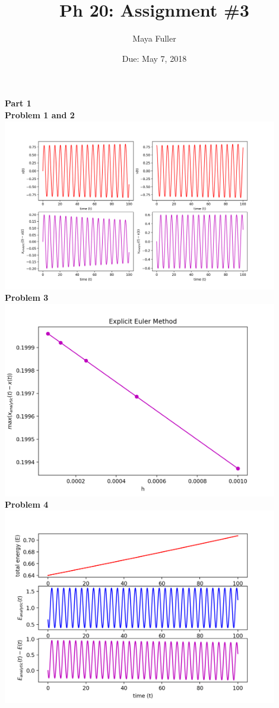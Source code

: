 \documentclass[12pt]{article}
\title{Ph 20: Assignment \#3}
\author{Maya Fuller}
\date{Due: May 7, 2018} %
\begin{document}
	
	
	\maketitle

	\noindent\textbf{\large Part 1}\\
	
	\indent\textbf{Problem 1 and 2}\\
		\includegraphics[width=0.9\textwidth]{Figure_1.png}\\
		
	\indent\textbf{Problem 3}\\
		\includegraphics[width=0.9\textwidth]{Figure_3.png}\\
		
	\indent\textbf{Problem 4}\\
		\includegraphics[width=0.9\textwidth]{Figure_2.png}\\
		
\end{document}
